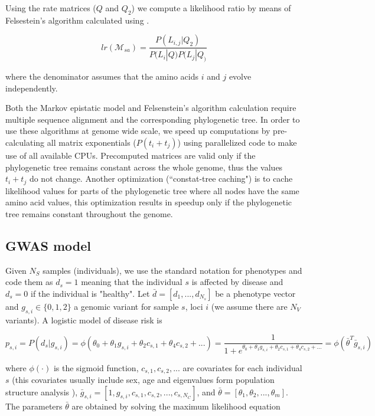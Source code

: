 Using the rate matrices ($Q$ and $Q_2$) we compute a likelihood ratio by means of Felsestein’s algorithm calculated using .

\[
lr(\mathcal{M}_{sa}) = \frac{P(L_{i,j} | Q_2)}{P(L_i | Q) P(L_j | Q_)}
\]

where the denominator assumes that the amino acids $i$ and $j$ evolve independently. 

Both the Markov epistatic model and Felsenstein’s algorithm calculation require multiple sequence alignment and the corresponding phylogenetic tree. In order to use these algorithms at genome wide scale, we speed up computations by pre-calculating all matrix exponentials ($P(t_i+t_j)$) using parallelized code to make use of all available CPUs. Precomputed matrices are valid only if the phylogenetic tree remains constant across the whole genome, thus the values $t_i+t_j$ do not change. Another optimization (``constat-tree caching") is to cache likelihood values for parts of the phylogenetic tree where all nodes have the same amino acid values, this optimization results in speedup only if the phylogenetic tree remains constant throughout the genome.

\subsection{GWAS model}

Given $N_S$ samples (individuals), we use the standard notation for phenotypes and code them as $d_s=1$ meaning that the individual $s$ is affected by disease and $d_s=0$ if the individual is "healthy". Let $\bar{d} = [d_1, ..., d_{N_s}]$ be a phenotype vector and $g_{s,i} \in \{0,1,2\}$ a genomic variant for sample $s$, loci $i$ (we assume there are $N_V$ variants). A logistic model of disease risk \cite{balding2006tutorial} is

\[
p_{s,i} = P( d_s | g_{s,i} ) = \phi( \theta_0 + \theta_1 g_{s,i} + \theta_2 c_{s,1} + \theta_4 c_{s,2} + ... ) = \frac{1}{1 + e^{\theta_0 + \theta_1 g_{s,i} + \theta_2 c_{s,1} + \theta_4 c_{s,2} + ...}} = \phi( \bar{\theta}^T \bar{g}_{s,i})
\]

where $\phi(\cdot)$ is the sigmoid function, $c_{s,1}, c_{s,2}, ... $ are covariates for each individual $s$ (this covariates usually include sex, age and eigenvalues form population structure analysis \cite{REF}), $\bar{g}_{s,i} = [ 1, g_{s,i} , c_{s,1}, c_{s,2}, ... , c_{s,N_C} ]$, and $\bar{\theta} = [\theta_1, \theta_2, ..., \theta_m] $. The parameters $\bar{\theta}$ are obtained by solving the maximum likelihood equation


